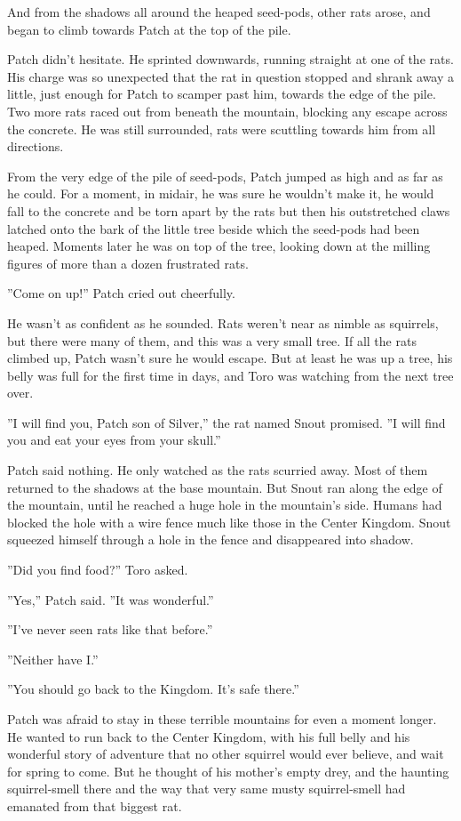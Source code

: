 \documentclass[12pt]{book}
\begin{document}
And from the shadows all around the heaped seed-pods, other rats arose, and began to climb towards Patch at the top of the pile.

Patch didn't hesitate. He sprinted downwards, running straight at one of the rats. His charge was so unexpected that the rat in question stopped and shrank away a little, just enough for Patch to scamper past him, towards the edge of the pile. Two more rats raced out from beneath the mountain, blocking any escape across the concrete. He was still surrounded, rats were scuttling towards him from all directions.

From the very edge of the pile of seed-pods, Patch jumped as high and as far as he could. For a moment, in midair, he was sure he wouldn't make it, he would fall to the concrete and be torn apart by the rats %
but then his outstretched claws latched onto the bark of the little tree beside which the seed-pods had been heaped. Moments later he was on top of the tree, looking down at the milling figures of more than a dozen frustrated rats.

''Come on up!'' Patch cried out cheerfully.

He wasn't as confident as he sounded. Rats weren't near as nimble as squirrels, but there were many of them, and this was a very small tree. If all the rats climbed up, Patch wasn't sure he would escape. But at least he was up a tree, his belly was full for the first time in days, and Toro was watching from the next tree over.

''I will find you, Patch son of Silver,'' the rat named Snout promised. ''I will find you and eat your eyes from your skull.''

Patch said nothing. He only watched as the rats scurried away. Most of them returned to the shadows at the base mountain. But Snout ran along the edge of the mountain, until he reached a huge hole in the mountain's side. Humans had blocked the hole with a wire fence much like those in the Center Kingdom. Snout squeezed himself through a hole in the fence and disappeared into shadow.

''Did you find food?'' Toro asked.

''Yes,'' Patch said. ''It was wonderful.''

''I've never seen rats like that before.''

''Neither have I.''

''You should go back to the Kingdom. It's safe there.''

Patch was afraid to stay in these terrible mountains for even a moment longer. He wanted to run back to the Center Kingdom, with his full belly and his wonderful story of adventure that no other squirrel would ever believe, and wait for spring to come. But he thought of his mother's empty drey, and the haunting squirrel-smell there %
and the way that very same musty squirrel-smell had emanated from that biggest rat.
\end{document}
